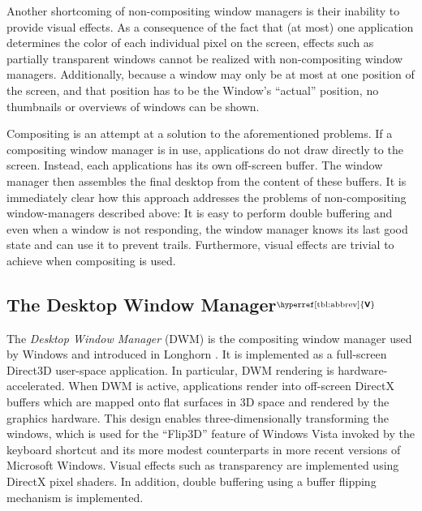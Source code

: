 \documentclass[10pt,twocolumn,a4paper]{article}
\newcommand{\bs}[1]{\textbf{\sffamily #1}}
\newcommand{\winver}[1]{$^{\text{\hyperref[tbl:abbrev]{\bs{#1}}}}$}
\newcommand{\winsubsection}[2]{\subsection[#1]{#1\winver{#2}}}
\begin{document}
			Another shortcoming of non-compositing window managers is their
			inability to provide visual effects. As a consequence of the fact
			that (at most) one application determines the color of each individual
			pixel on the screen, effects such as partially transparent windows
			cannot be realized with non-compositing window managers. Additionally,
			because a window may only be at most at one position of the screen,
			and that position has to be the Window's \enquote{actual} position,
			no thumbnails or overviews of windows can be shown.

			Compositing is an attempt at a solution to the aforementioned
			problems.  If a compositing window manager is in use, applications
			do not draw directly to the screen. Instead, each applications has
			its own off-screen buffer. The
			window manager then assembles the final
			desktop from the content of these buffers. It is immediately clear how this approach addresses the
			problems of non-compositing window-managers described above: It is
			easy to perform double buffering and even when a window is not
			responding, the window manager knows its last good state and can
			use it to prevent trails. Furthermore, visual effects are trivial
			to achieve when compositing is used. \cite{dwmoverview}

		\winsubsection{The Desktop Window Manager}{V}\label{sec:dwm}
			The \emph{Desktop Window Manager} (DWM) is the compositing window
			manager used by Windows and introduced in Longhorn
			\cite{dwmoverview}.  It is implemented as a full-screen Direct3D
			user-space application. In particular, DWM rendering is
			hardware-accelerated. When DWM is active, applications render into
			off-screen DirectX buffers which are mapped onto flat surfaces in
			3D space and rendered by the graphics hardware. This design enables
			three-dimensionally transforming the windows, which is used for the
			\enquote{Flip3D} feature of Windows Vista invoked by the keyboard
			shortcut  and its more modest counterparts in more
			recent versions of Microsoft Windows. Visual effects such as
			transparency are implemented using DirectX pixel shaders. In addition,
			double buffering using a buffer flipping mechanism is implemented.
			\cite{dwmdirectx}
\end{document}

